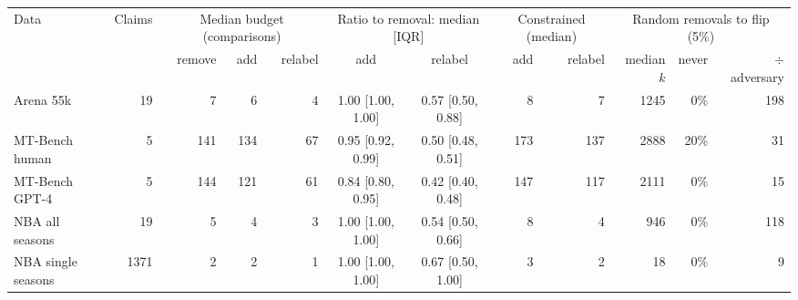 \begin{tabular}{lrrrrccrrrrr}
\toprule
Data & Claims & \multicolumn{3}{c}{Median budget (comparisons)} & \multicolumn{2}{c}{Ratio to removal: median [IQR]} & \multicolumn{2}{c}{Constrained (median)} & \multicolumn{3}{c}{Random removals to flip (5\%)} \\
\cmidrule(lr){3-5}\cmidrule(lr){6-7}\cmidrule(lr){8-9}\cmidrule(lr){10-12}
 & & remove & add & relabel & add & relabel & add & relabel & median $k$ & never & $\div$ adversary \\
\midrule
Arena 55k & 19 & 7 & 6 & 4 & 1.00 [1.00, 1.00] & 0.57 [0.50, 0.88] & 8 & 7 & 1245 & 0\% & 198 \\
MT-Bench human & 5 & 141 & 134 & 67 & 0.95 [0.92, 0.99] & 0.50 [0.48, 0.51] & 173 & 137 & 2888 & 20\% & 31 \\
MT-Bench GPT-4 & 5 & 144 & 121 & 61 & 0.84 [0.80, 0.95] & 0.42 [0.40, 0.48] & 147 & 117 & 2111 & 0\% & 15 \\
NBA all seasons & 19 & 5 & 4 & 3 & 1.00 [1.00, 1.00] & 0.54 [0.50, 0.66] & 8 & 4 & 946 & 0\% & 118 \\
NBA single seasons & 1371 & 2 & 2 & 1 & 1.00 [1.00, 1.00] & 0.67 [0.50, 1.00] & 3 & 2 & 18 & 0\% & 9 \\
\bottomrule
\end{tabular}
